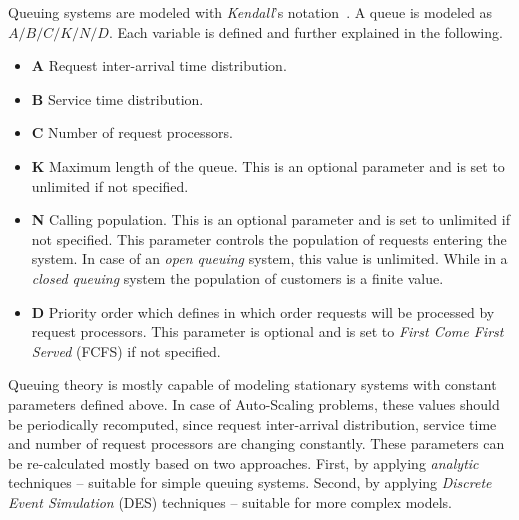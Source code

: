 Queuing systems are modeled with \emph{Kendall}'s notation~\cite{kendall1953}. A queue is modeled as $A/B/C/K/N/D$. Each variable is defined and further explained in the following.
\begin{itemize}
    \item \textbf{A} Request inter-arrival time distribution.
    \item \textbf{B} Service time distribution.
    \item \textbf{C} Number of request processors.
    \item \textbf{K} Maximum length of the queue. This is an optional parameter and is set to unlimited if not specified.
    \item \textbf{N} Calling population. This is an optional parameter and is set to unlimited if not specified. This parameter controls the population of requests entering the system. In case of an \emph{open queuing} system, this value is unlimited. While in a \emph{closed queuing} system the population of customers is a finite value.
    \item \textbf{D} Priority order which defines in which order requests will be processed by request processors. This parameter is optional and is set to \emph{First Come First Served} (FCFS) if not specified.
\end{itemize}

Queuing theory is mostly capable of modeling stationary systems with constant parameters defined above. In case of Auto-Scaling problems, these values should be periodically recomputed, since request inter-arrival distribution, service time and number of request processors are changing constantly. These parameters can be re-calculated mostly based on two approaches. First, by applying \emph{analytic} techniques -- suitable for simple queuing systems. Second, by applying \emph{Discrete Event Simulation} (DES) techniques -- suitable for more complex models.
